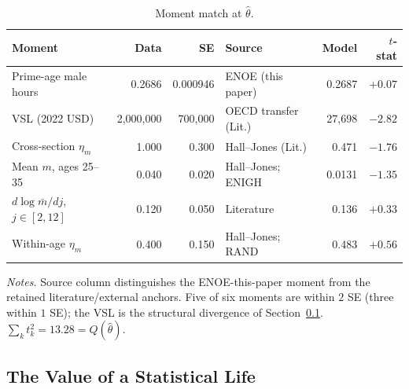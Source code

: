 \documentclass[12pt,a4paper]{article}
\begin{document}
\begin{table}[H]
\centering
\caption{Moment match at $\widehat\theta$.}
\label{tab:moment_match}
\begin{tabular}{lrrlrr}
\toprule
Moment                         & Data         & SE        & Source                & Model     & $t$-stat \\
\midrule
Prime-age male hours           & 0.2686       & 0.000946  & ENOE (this paper)     & 0.2687    & $+0.07$  \\
VSL (2022 USD)                 & 2{,}000{,}000 & 700{,}000 & OECD transfer (Lit.)  & 27{,}698  & $-2.82$  \\
Cross-section $\eta_m$         & 1.000        & 0.300     & Hall--Jones (Lit.)    & 0.471     & $-1.76$  \\
Mean $m$, ages 25--35          & 0.040        & 0.020     & Hall--Jones; ENIGH    & 0.0131    & $-1.35$  \\
$d\log\bar m/dj$, $j\in[2,12]$ & 0.120        & 0.050     & Literature            & 0.136     & $+0.33$  \\
Within-age $\eta_m$            & 0.400        & 0.150     & Hall--Jones; RAND     & 0.483     & $+0.56$  \\
\bottomrule
\end{tabular}

\vspace{0.5em}
\begin{minipage}{0.92\textwidth}
\footnotesize \textit{Notes.} Source column distinguishes the ENOE-this-paper moment from the retained literature/external anchors. Five of six moments are within $2$ SE (three within $1$ SE); the VSL is the structural divergence of Section~\ref{subsec:vsl_structural}. $\sum_k t_k^2 = 13.28 = Q(\widehat\theta)$.
\end{minipage}
\end{table}

\subsection{The Value of a Statistical Life}
\label{subsec:vsl_structural}
\end{document}
